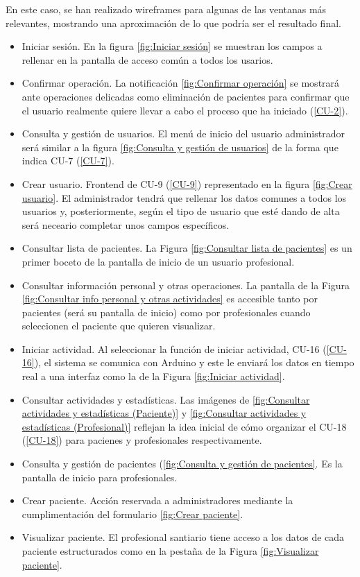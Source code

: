 En este caso, se han realizado wireframes para algunas de las ventanas más relevantes, mostrando una aproximación de lo que podría ser el resultado final.
\begin{itemize}
    \item Iniciar sesión. En la figura \ref{fig:Iniciar sesión} se muestran los campos a rellenar en la pantalla de acceso común a todos los usarios.
    \item Confirmar operación. La notificación \ref{fig:Confirmar operación} se mostrará ante operaciones delicadas como eliminación de pacientes para confirmar que el usuario realmente quiere llevar a cabo el proceso que ha iniciado (\ref{CU-2}).
    \item Consulta y gestión de usuarios. El menú de inicio del usuario administrador será similar a la figura \ref{fig:Consulta y gestión de usuarios} de la forma que indica CU-7 (\ref{CU-7}).
    \item Crear usuario. Frontend de CU-9 (\ref{CU-9}) representado en la figura \ref{fig:Crear usuario}. El administrador tendrá que rellenar los datos comunes a todos los usuarios y, posteriormente, según el tipo de usuario que esté dando de alta será neceario completar unos campos específicos.
    \item Consultar lista de pacientes. La Figura \ref{fig:Consultar lista de pacientes} es un primer boceto de la pantalla de inicio de un usuario profesional.
    \item Consultar información personal y otras operaciones. La pantalla de la Figura \ref{fig:Consultar info personal y otras actividades} es accesible tanto por pacientes (será su pantalla de inicio) como por profesionales cuando seleccionen el paciente que quieren visualizar.
    \item Iniciar actividad. Al seleccionar la función de iniciar actividad, CU-16 (\ref{CU-16}), el sistema se comunica con Arduino y este le enviará los datos en tiempo real a una interfaz como la de la Figura \ref{fig:Iniciar actividad}.
    \item Consultar actividades y estadísticas. Las imágenes de \ref{fig:Consultar actividades y estadísticas (Paciente)} y \ref{fig:Consultar actividades y estadísticas (Profesional)} reflejan la idea inicial de cómo organizar el CU-18 (\ref{CU-18}) para pacienes y profesionales respectivamente.
    \item Consulta y gestión de pacientes (\ref{fig:Consulta y gestión de pacientes}. Es la pantalla de inicio para profesionales.
    \item Crear paciente. Acción reservada a administradores mediante la cumplimentación del formulario \ref{fig:Crear paciente}. 
    \item Visualizar paciente. El profesional santiario tiene acceso a los datos de cada paciente estructurados como en la pestaña de la Figura \ref{fig:Visualizar paciente}.
\end{itemize}


